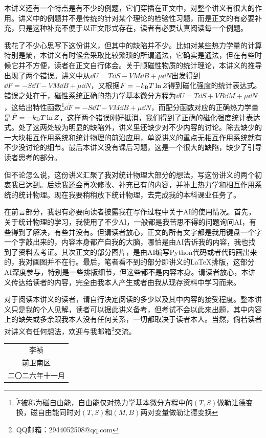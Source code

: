 \documentclass[../../main.tex]{subfiles}
\begin{document}
本讲义还有一个特点是有不少的例题，它们穿插在正文中，对整个讲义有很大的作用。讲义中的例题并不是传统的针对某个理论的检验性习题，而是正文的有必要补充，只是这种补充不便于以正文形式存在，读者有必要认真阅读每一个例题。

我花了不少心思写下这份讲义，但其中的缺陷并不少。比如对某些热力学量的计算特别是熵，本讲义有时候会采取比较繁琐的所谓通法，它确实是通法，但在有些时候它并不方便，读者在正文自行体会。关于顺磁性物质的统计理论，本讲义的推导出现了两个错误。讲义中从\(\dd U=T\dd S-VM\dd B+\mu\dd N\)出发得到\(\dd F=-S\dd T-VM\dd B+\mu\dd N\)，又根据\(F=-k_{\mathrm{B}} T\ln Z\)得到磁化强度的统计表达式。错误之处在于，磁性系统正确的热力学基本微分方程为\(\dd U=T\dd S+VB\dd M+\mu\dd N\)，这给出特性函数\footnote{\(\tilde{F}\)被称为磁自由能，自由能仅对热力学基本微分方程中的\((T,S)\)做勒让德变换，磁自由能同时对\((T,S)\)和\((M,B)\)两对变量做勒让德变换}\(\dd \tilde{F}=-S\dd T-VM\dd B+\mu\dd N\)，而配分函数对应的正确热力学量是\(\tilde{F}=-k_{\mathrm{B}} T\ln Z\)，这样两个错误刚好抵消，我们得到了正确的磁化强度统计表达式。处了这两处较为明显的缺陷外，讲义里还缺少对不少内容的讨论。除去缺少的一大块相互作用系统和统计物理的前沿应用，单说讲义的重点无相互作用系统就有不少没讨论的细节。最后本讲义没有课后习题，这是一个很大的缺陷，缺少了引导读者思考的部分。

但不论怎么说，这份讲义汇聚了我对统计物理大部分的想法，写这份讲义的两个初衷我已达到。后续我还会再次修改、补充已有的内容，并补上热力学和相互作用系统的统计物理。现在我要稍稍放下统计物理，去完成我的本科课业任务了。

在前言部分，我想有必要向读者披露我在写作过程中关于AI的使用情况。首先，关于统计物理的学习，我使用了不少AI，一般都是我苦思不得的问题询问AI，有些得到了解决，有些并没有。但请读者放心，正文的所有文字都是我用键盘一个字一个字敲出来的，内容本身都产自我的大脑，哪怕是由AI告诉我的内容，我也找到了资料去考证。其次正文的部分图片，是由AI编写Python代码或者\tikzname 代码画出来的，我对画图并不在行。最后，笔者看不到的部分即讲义的\LaTeX 排版，这部分AI深度参与，特别是一些排版细节，但这些都不是内容本身。请读者放心，本讲义传达给读者的内容，完全由我本人产生或者由我从现存资料中学习而来。

对于阅读本讲义的读者，请自行决定阅读的多少以及其中内容的接受程度。整本讲义只是我的个人见解，读者可以据此讲义备考，但考试不会以此来出题，其中内容上的缺失或多余跟我本人没有任何关系，一切都取决于读者本人。当然，倘若读者对讲义有任何想法，欢迎与我邮箱\footnote{QQ邮箱：2944052508@qq.com}交流。

\vspace{1.5em}
\hfill
\begin{tabular}{c}
李祯\\
前卫南区\\
二〇二六年十一月
\end{tabular}
\end{document}
